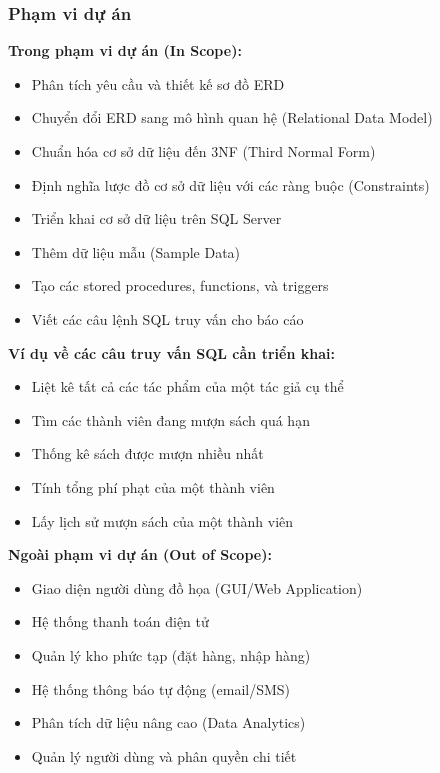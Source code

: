\documentclass[12pt,a4paper]{article}
\begin{document}
\subsubsection{Phạm vi dự án}

\textbf{Trong phạm vi dự án (In Scope):}
\begin{itemize}
    \item Phân tích yêu cầu và thiết kế sơ đồ ERD
    \item Chuyển đổi ERD sang mô hình quan hệ (Relational Data Model)
    \item Chuẩn hóa cơ sở dữ liệu đến 3NF (Third Normal Form)
    \item Định nghĩa lược đồ cơ sở dữ liệu với các ràng buộc (Constraints)
    \item Triển khai cơ sở dữ liệu trên SQL Server
    \item Thêm dữ liệu mẫu (Sample Data)
    \item Tạo các stored procedures, functions, và triggers
    \item Viết các câu lệnh SQL truy vấn cho báo cáo
\end{itemize}

\textbf{Ví dụ về các câu truy vấn SQL cần triển khai:}
\begin{itemize}
    \item Liệt kê tất cả các tác phẩm của một tác giả cụ thể
    \item Tìm các thành viên đang mượn sách quá hạn
    \item Thống kê sách được mượn nhiều nhất
    \item Tính tổng phí phạt của một thành viên
    \item Lấy lịch sử mượn sách của một thành viên
\end{itemize}

\textbf{Ngoài phạm vi dự án (Out of Scope):}
\begin{itemize}
    \item Giao diện người dùng đồ họa (GUI/Web Application)
    \item Hệ thống thanh toán điện tử
    \item Quản lý kho phức tạp (đặt hàng, nhập hàng)
    \item Hệ thống thông báo tự động (email/SMS)
    \item Phân tích dữ liệu nâng cao (Data Analytics)
    \item Quản lý người dùng và phân quyền chi tiết
\end{itemize}
\end{document}
